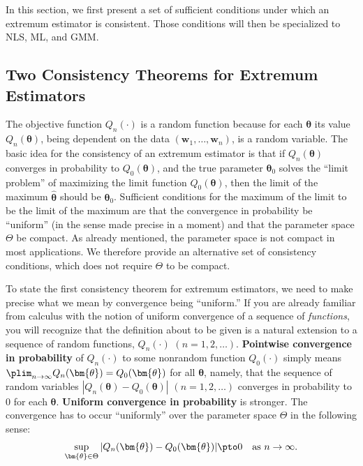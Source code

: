 
In this section, we first present a set of sufficient conditions under which an extremum estimator is consistent. Those conditions will then be specialized to NLS, ML, and GMM.

\subsection*{Two Consistency Theorems for Extremum Estimators}

The objective function $Q_n(\cdot)$ is a random function because for each $\bm{\theta}$ its value $Q_n(\bm{\theta})$, being dependent on the data $(\mathbf{w}_1, \ldots, \mathbf{w}_n)$, is a random variable. The basic idea for the consistency of an extremum estimator is that if $Q_n(\bm{\theta})$ converges in probability to $Q_0(\bm{\theta})$, and the true parameter $\bm{\theta}_0$ solves the ``limit problem'' of maximizing the limit function $Q_0(\bm{\theta})$, then the limit of the maximum $\hat{\bm{\theta}}$ should be $\bm{\theta}_0$. Sufficient conditions for the maximum of the limit to be the limit of the maximum are that the convergence in probability be ``uniform'' (in the sense made precise in a moment) and that the parameter space $\Theta$ be compact. As already mentioned, the parameter space is not compact in most applications. We therefore provide an alternative set of consistency conditions, which does not require $\Theta$ to be compact.

To state the first consistency theorem for extremum estimators, we need to make precise what we mean by convergence being ``uniform.'' If you are already familiar from calculus with the notion of uniform convergence of a sequence of \emph{functions}, you will recognize that the definition about to be given is a natural extension to a sequence of random functions, $Q_n(\cdot)$ $(n = 1, 2, \ldots)$. \textbf{Pointwise convergence in probability} of $Q_n(\cdot)$ to some nonrandom function $Q_0(\cdot)$ simply means $\plim_{n \to \infty} Q_n(\bm{\theta}) = Q_0(\bm{\theta})$ for all $\bm{\theta}$, namely, that the sequence of random variables $|Q_n(\bm{\theta}) - Q_0(\bm{\theta})|$ $(n = 1, 2, \ldots)$ converges in probability to 0 for each $\bm{\theta}$. \textbf{Uniform convergence in probability} is stronger. The convergence has to occur ``uniformly'' over the parameter space $\Theta$ in the following sense:
\begin{equation}
\label{eq:7.2.1}
\sup_{\bm{\theta} \in \Theta} |Q_n(\bm{\theta}) - Q_0(\bm{\theta})| \pto 0 \quad \text{as } n \to \infty.
\end{equation}


